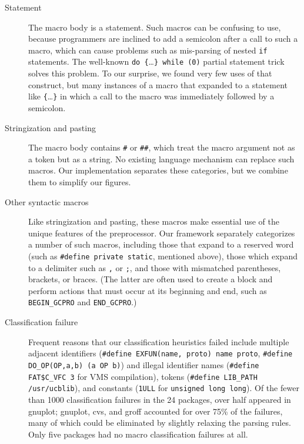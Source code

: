\documentclass[11pt]{article}
\begin{document}
\begin{description}

\item[Statement]  The macro body is a statement.  Such macros can be
  confusing to use, because programmers are inclined to add a semicolon
  after a call to such a macro, which can cause problems such as 
  mis-parsing of nested {\tt if} statements.  The
  well-known \verb|do {|\ldots\verb|} while (0)| partial statement trick
  solves this problem.  To our surprise, we found very few uses of that
  construct, but many instances of a macro that expanded to a statement
  like \verb|{|\ldots\verb|}| in which a call to the macro was immediately
  followed by a semicolon.

\item[Stringization and pasting]  The macro body contains {\tt \#} or
  {\tt \#\#}, which treat the macro argument not as a token but as a
  string.  No existing language mechanism can replace such macros.  Our
  implementation separates these categories, but we combine them to
  simplify our figures.

\item[Other syntactic macros]  Like stringization and pasting, these
  macros make essential use of the unique features of the preprocessor.
  Our framework separately categorizes a number of such macros, including
  those that expand to a reserved word (such as {\tt \#define private
  static}, mentioned above), those which expand to a delimiter such as
  {\tt ,} or {\tt ;}, and those with mismatched parentheses, brackets, or
  braces.  (The latter are often used to create a block and perform actions
  that must occur at its beginning and end, such as \verb|BEGIN_GCPRO| and
  \verb|END_GCPRO|.)

\item[Classification failure]  Frequent reasons that our
classification heuristics failed
  include multiple adjacent identifiers
  ({\tt \#define EXFUN(name, proto) name proto},
  {\tt \#define \verb|DO_OP|(OP,a,b) (a OP b)}) and illegal identifier
  names ({\tt \#define \verb|FAT$C_VFC| 3} for VMS compilation), tokens %
  ({\tt \#define \verb|LIB_PATH| /usr/ucblib}), and constants ({\tt 1ULL} for
  {\tt unsigned long long}).  Of the fewer than 1000 classification
  failures in the 24 packages, over half appeared in gnuplot; gnuplot, cvs,
  and groff accounted for over 75\% of the failures, many of which could be
  eliminated by slightly relaxing the parsing rules.  Only five packages had no
  macro classification failures at all.



\end{description}
\end{document}
